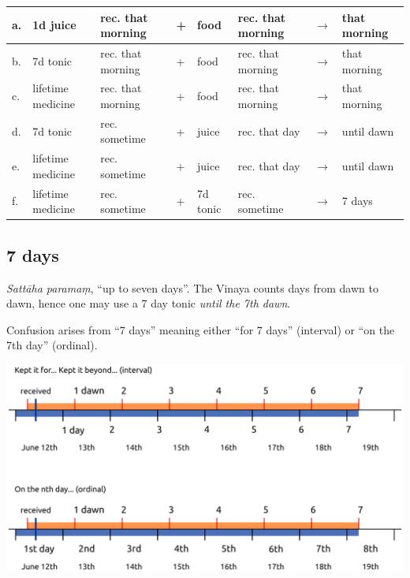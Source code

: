 \begin{center}
\begin{tabular}{llllllll}
a. & 1d juice & rec. that morning & + & food & rec. that morning & \(\rightarrow\) & that morning\\
\hline
b. & 7d tonic & rec. that morning & + & food & rec. that morning & \(\rightarrow\) & that morning\\
\hline
c. & lifetime medicine & rec. that morning & + & food & rec. that morning & \(\rightarrow\) & that morning\\
\hline
d. & 7d tonic & rec. sometime & + & juice & rec. that day & \(\rightarrow\) & until dawn\\
\hline
e. & lifetime medicine & rec. sometime & + & juice & rec. that day & \(\rightarrow\) & until dawn\\
\hline
f. & lifetime medicine & rec. sometime & + & 7d tonic & rec. sometime & \(\rightarrow\) & 7 days\\
\end{tabular}
\end{center}

\clearpage

\subsection{7 days}

\emph{Sattāha paramaṃ}, ``up to seven days''. The Vinaya counts days
from dawn to dawn, hence one may use a 7 day tonic \emph{until the 7th
dawn}.

Confusion arises from ``7 days'' meaning either ``for 7 days''
(interval) or ``on the 7th day'' (ordinal).

\vspace*{\baselineskip}
\includegraphics[width=\linewidth]{../../src/includes/figures/7-days.png}

